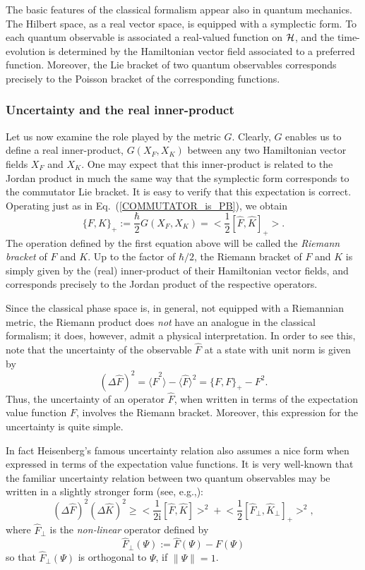 \documentclass[12pt,aps,eqsecnum,tighten]{revtex4-2}
\def\be{\begin{equation}}
\def\ee{\end{equation}}
\def\<{\langle}
\def\>{\rangle}
\def\D{\Delta}
\def\i{\mathrm{i}}
\def\H{{\cal H}}
\newcommand{\eqn}[1]{Eq.~(\ref{#1})}
\newcommand{\hvf}[1]{{X_{#1}}}
\begin{document}
The basic features of the classical formalism appear also in quantum
mechanics.  The Hilbert space, as a real vector space, is equipped
with a symplectic form.  To each quantum observable is associated a
real-valued function on $\H$, and the time-evolution is determined by
the Hamiltonian vector field associated to a preferred function.
Moreover, the Lie bracket of two quantum observables corresponds
precisely to the Poisson bracket of the corresponding functions.


\subsubsection{Uncertainty and the real inner-product}

Let us now examine the role played by the metric $G$. Clearly, $G$
enables us to define a real inner-product, $G(X_F, X_K)$ between any
two Hamiltonian vector fields $X_F$ and $X_K$. One may expect that
this inner-product is related to the Jordan product in much the same
way that the symplectic form corresponds to the commutator Lie
bracket. It is easy to verify that this expectation is
correct. Operating just as in \eqn{COMMUTATOR_is_PB}, we obtain 
%
\be
\label{symmetric_bracket}
\{ F, K \}_+ := \frac{\hbar}{2} G(\hvf{F}, \hvf{K})
= \bigg< \frac{1}{2} [\hat{F}, \hat{K}]_+ \bigg>.
\ee
%
The operation defined by the first equation above will be called the
{\em Riemann bracket} of $F$ and $K$.  Up to the factor of
$\hbar / 2$, the Riemann bracket of $F$ and $K$ is simply given
by the (real) inner-product of their Hamiltonian vector fields, and
corresponds precisely to the Jordan product of the respective
operators.

Since the classical phase space is, in general, not equipped with a
Riemannian metric, the Riemann product does {\em not} have an analogue
in the classical formalism; it does, however, admit a physical
interpretation.  In order to see this, note that the uncertainty of
the observable $\hat{F}$ at a state with unit norm is given by
%
\be \label{uncertainty}
(\D \hat{F})^2 = \< \hat{F}^2 \> - \< \hat{F} \>^2
= \{ F, F \}_+ - F^2.
\ee
%
Thus, the uncertainty of an operator $\hat{F}$, when written in terms
of the expectation value function $F$, involves the Riemann bracket.
Moreover, this expression for the uncertainty is quite simple.

In fact Heisenberg's famous uncertainty relation also assumes a nice
form when expressed in terms of the expectation value functions. It is
very well-known that the familiar uncertainty relation between two
quantum observables may be written in a slightly stronger
form (see, e.g.,\cite{shankar}): 
%
\be \label{std_unc_reln}
(\D \hat{F})^2 (\D \hat{K})^2 \ge
\bigg< \frac{1}{2\i} [ \hat{F}, \hat{K} ] \bigg>^2
+ \bigg< \frac{1}{2} [ \hat{F}_{\perp}, 
\hat{K}_{\perp} ]_+ \bigg>^2,
\ee
%
where $\hat{F}_{\perp}$ is the {\em non-linear} operator defined
by
\[
 \hat{F}_{\perp}(\Psi) := \hat{F}(\Psi) - F(\Psi)
\]
so that $\hat{F}_{\perp}(\Psi)$ is orthogonal to $\Psi$,
if $\| \Psi \| = 1$.
\end{document}
